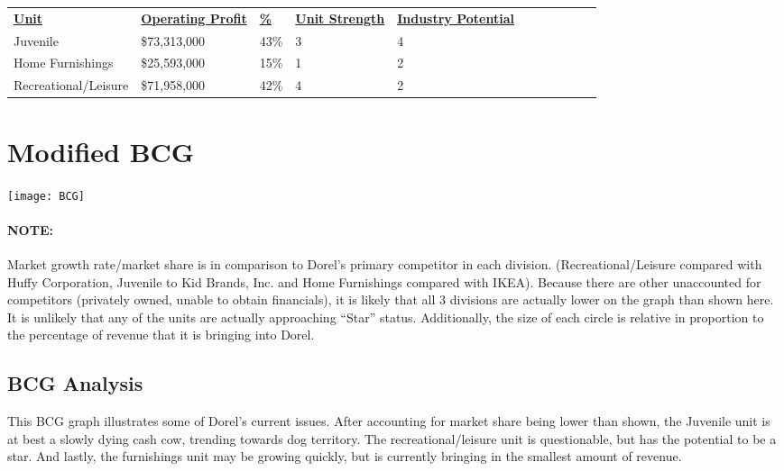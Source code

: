 {\begin{table}[h]
    \begin{tabular}{lllllllllll}
    {\bf \underline{Unit}}             &  {\bf \underline{Operating Profit}} & {\bf \underline{\%}}  & {\bf \underline{Unit Strength}} & {\bf \underline{Industry Potential}} \\
    Juvenile             & \$73,313,000     & 43\% & 3 & 4 \\
    Home Furnishings     & \$25,593,000     & 15\% & 1 & 2 \\
    Recreational/Leisure  & \$71,958,000     & 42\% & 4 & 2 \\
    \end{tabular}
\end{table}
\section{Modified BCG}
\label{chp:bcg}
\centerline{\texttt{[image: BCG]}}
\paragraph{NOTE:}Market growth rate/market share is in comparison to Dorel’s primary competitor in each division.  (Recreational/Leisure compared with Huffy Corporation, Juvenile to Kid Brands, Inc. and Home Furnishings compared with IKEA).  Because there are other unaccounted for competitors (privately owned, unable to obtain financials), it is likely that all 3 divisions are actually lower on the graph than shown here.  It is unlikely that any of the units are actually approaching “Star” status.  Additionally, the size of each circle is relative in proportion to the percentage of revenue that it is bringing into Dorel.
\subsection{BCG Analysis}
This BCG graph illustrates some of Dorel's current issues.  After accounting for market share being lower than shown, the Juvenile unit is at best a slowly dying cash cow, trending towards dog territory.  The recreational/leisure unit is questionable, but has the potential to be a star.  And lastly, the furnishings unit may be growing quickly, but is currently bringing in the smallest amount of revenue.

}
